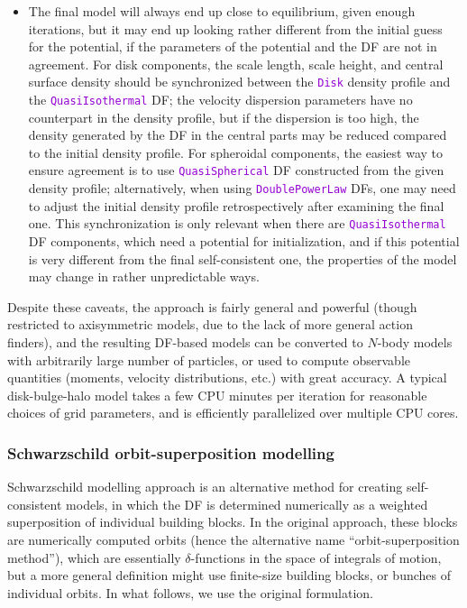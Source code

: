 \documentclass[12pt]{article}
\newcommand{\ttt}[1]{\textcolor{darkviolet}{\texttt{#1}}}
\begin{document}
\begin{itemize}
\item The final model will always end up close to equilibrium, given enough iterations, but it may end up looking rather different from the initial guess for the potential, if the parameters of the potential and the DF are not in agreement. For disk components, the scale length, scale height, and central surface density should be synchronized between the \ttt{Disk} density profile and the \ttt{QuasiIsothermal} DF; the velocity dispersion parameters have no counterpart in the density profile, but if the dispersion is too high, the density generated by the DF in the central parts may be reduced compared to the initial density profile. For spheroidal components, the easiest way to ensure agreement is to use \ttt{QuasiSpherical} DF constructed from the given density profile; alternatively, when using \ttt{DoublePowerLaw} DFs, one may need to adjust the initial density profile retrospectively after examining the final one. This synchronization is only relevant when there are \ttt{QuasiIsothermal} DF components, which need a potential for initialization, and if this potential is very different from the final self-consistent one, the properties of the model may change in rather unpredictable ways.
\end{itemize}
Despite these caveats, the approach is fairly general and powerful (though restricted to axisymmetric models, due to the lack of more general action finders), and the resulting DF-based models can be converted to $N$-body models with arbitrarily large number of particles, or used to compute observable quantities (moments, velocity distributions, etc.) with great accuracy. A typical disk-bulge-halo model takes a few CPU minutes per iteration for reasonable choices of grid parameters, and is efficiently parallelized over multiple CPU cores.


\subsubsection{Schwarzschild orbit-superposition modelling}  \label{sec:Schwarzschild}

Schwarzschild modelling approach \cite{Schwarzschild1979} is an alternative method for creating self-consistent models, in which the DF is determined numerically as a weighted superposition of individual building blocks. In the original approach, these blocks are numerically computed orbits (hence the alternative name ``orbit-superposition method''), which are essentially $\delta$-functions in the space of integrals of motion, but a more general definition might use finite-size building blocks, or bunches of individual orbits. In what follows, we use the original formulation.
\end{document}
